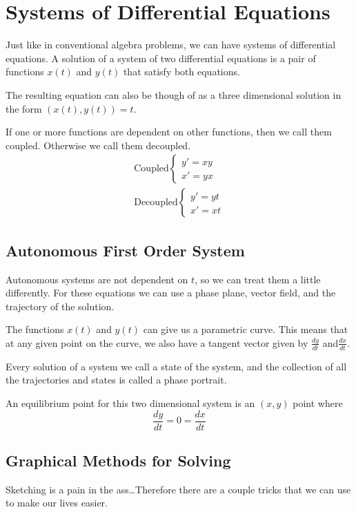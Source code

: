 \section{Systems of Differential Equations}

Just like in conventional algebra problems, we can have systems of differential equations. A solution of a system of two differential equations is a pair of functions $x(t)$ and $y(t)$ that satisfy both equations.

The resulting equation can also be though of as a three dimensional solution in the form $(x(t), y(t)) = t$.

If one or more functions are dependent on other functions, then we call them coupled. Otherwise we call them decoupled.
\[
\begin{aligned}
\text{Coupled}
\begin{cases}
y\prime = xy\\
x\prime = yx
\end{cases}\\
\text{Decoupled}
\begin{cases}
y\prime = yt\\
x\prime = xt
\end{cases}
\end{aligned}
\]

    \subsection{Autonomous First Order System}
    Autonomous systems are not dependent on $t$, so we can treat them a little differently. For these equations we can use a phase plane, vector field, and the trajectory of the solution.

    The functions $x(t)$ and $y(t)$ can give us a parametric curve. This means that at any given point on the curve, we also have a tangent vector given by $\frac{dy}{dt}$ and$\frac{dx}{dt}$.

    Every solution of a system we call a state of the system, and the collection of all the trajectories and states is called a phase portrait.

    An equilibrium point for this two dimensional system is an $(x,y)$ point where
    \[
    \frac{dy}{dt} = 0 = \frac{dx}{dt}
    \]

    \subsection{Graphical Methods for Solving}
    Sketching is a pain in the ass\dots Therefore there are a couple tricks that we can use to make our lives easier.


